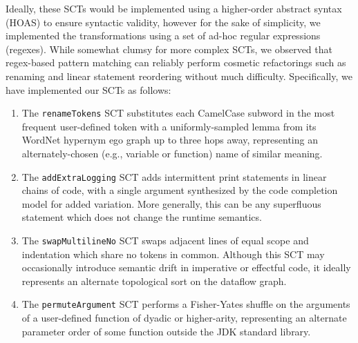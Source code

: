 \documentclass[usenames,dvipsnames]{article} %
\begin{document}
  Ideally, these SCTs would be implemented using a higher-order abstract syntax (HOAS) to ensure syntactic validity, however for the sake of simplicity, we implemented the transformations using a set of ad-hoc regular expressions (regexes). While somewhat clumsy for more complex SCTs, we observed that regex-based pattern matching can reliably perform cosmetic refactorings such as renaming and linear statement reordering without much difficulty. Specifically, we have implemented our SCTs as follows:

  \begin{enumerate}[itemsep=1ex]
    \item The \lstinline|renameTokens| SCT substitutes each CamelCase subword in the most frequent user-defined token with a uniformly-sampled lemma from its WordNet hypernym ego graph up to three hops away, representing an alternately-chosen (e.g., variable or function) name of similar meaning.
    \item The \lstinline|addExtraLogging| SCT adds intermittent print statements in linear chains of code, with a single argument synthesized by the code completion model for added variation. More generally, this can be any superfluous statement which does not change the runtime semantics.
    \item The \lstinline|swapMultilineNo| SCT swaps adjacent lines of equal scope and indentation which share no tokens in common. Although this SCT may occasionally introduce semantic drift in imperative or effectful code, it ideally represents an alternate topological sort on the dataflow graph.
    \item The \lstinline|permuteArgument| SCT performs a Fisher-Yates shuffle on the arguments of a user-defined function of dyadic or higher-arity, representing an alternate parameter order of some function outside the JDK standard library.
  \end{enumerate}

\end{document}
